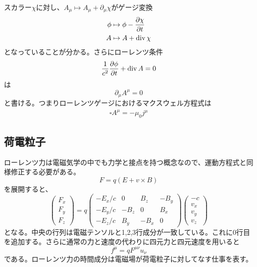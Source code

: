     スカラー$\chi$に対し、$A_\mu \mapsto A_\mu + \partial_\mu \chi$がゲージ変換
    \begin{align*}
        \phi &\mapsto \phi - \pdv{\chi}{t}\\
        A &\mapsto A + \operatorname{div}\chi
    \end{align*}
    となっていることが分かる。さらにローレンツ条件
        \[\frac{1}{c^2}\pdv{\phi}{t} + \operatorname{div} A = 0\]
    は
        \[\partial_\mu A^\mu = 0\]
    と書ける。つまりローレンツゲージにおけるマクスウェル方程式は
    \begin{align*}
        \square A^\mu = -\mu_0 j^\mu
    \end{align*}

\subsection{荷電粒子}
    ローレンツ力は電磁気学の中でも力学と接点を持つ概念なので、運動方程式と同様修正する必要がある。
        \[F = q(E + v \times B)\]
    を展開すると、
    \[
        \begin{pmatrix}
            F_x\\
            F_y\\
            F_z
        \end{pmatrix}
        = q
        \begin{pmatrix}
            -E_x/c & 0 & B_z & -B_y\\
            -E_y/c & -B_z & 0 & B_x\\
            -E_z/c & B_y & -B_x & 0
        \end{pmatrix}
        \begin{pmatrix}
            -c\\
            v_x\\
            v_y\\
            v_z
        \end{pmatrix}
    \]
    となる。中央の行列は電磁テンソルと1,2,3行成分が一致している。これに0行目を追加する。さらに通常の力と速度の代わりに四元力と四元速度を用いると
        \[f^\mu = q F^{\mu\nu} u_\nu\]
    である。ローレンツ力の時間成分は電磁場が荷電粒子に対してなす仕事を表す。

